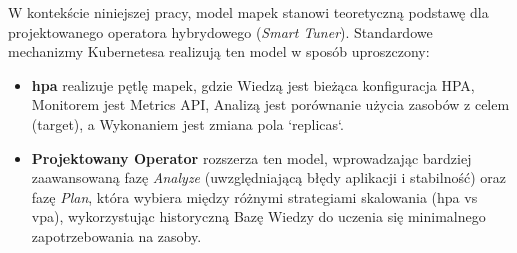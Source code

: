 W kontekście niniejszej pracy, model \gls{mapek} stanowi teoretyczną podstawę dla projektowanego operatora hybrydowego (\textit{Smart Tuner}). Standardowe mechanizmy Kubernetesa realizują ten model w sposób uproszczony:
\begin{itemize}
    \item \textbf{\gls{hpa}} realizuje pętlę \gls{mapek}, gdzie Wiedzą jest bieżąca konfiguracja HPA, Monitorem jest Metrics API, Analizą jest porównanie użycia zasobów z celem (target), a Wykonaniem jest zmiana pola `replicas`.
    \item \textbf{Projektowany Operator} rozszerza ten model, wprowadzając bardziej zaawansowaną fazę \textit{Analyze} (uwzględniającą błędy aplikacji i stabilność) oraz fazę \textit{Plan}, która wybiera między różnymi strategiami skalowania (\gls{hpa} vs \gls{vpa}), wykorzystując historyczną Bazę Wiedzy do uczenia się minimalnego zapotrzebowania na zasoby.
\end{itemize}
